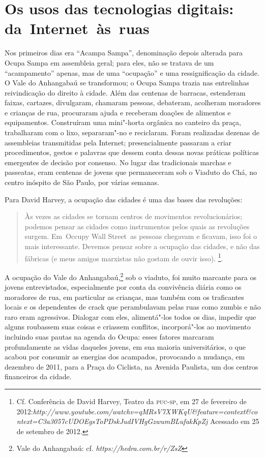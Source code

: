 \section{Os usos das tecnologias digitais: da~Internet~às~ruas}

\noindent{}Nos primeiros dias era ``Acampa Sampa'', denominação depois alterada
para Ocupa Sampa em assembleia geral; para eles, não se tratava de um
``acampamento'' apenas, mas de uma ``ocupação'' e uma ressignificação da
cidade. O Vale do Anhangabaú se transformou; o Ocupa Sampa trazia nas
entrelinhas reivindicação do direito à cidade. Além das centenas de
barracas, estenderam faixas, cartazes, divulgaram, chamaram pessoas,
debateram, acolheram moradores e crianças de rua, procuraram ajuda e
receberam doações de alimentos e equipamentos. Construíram uma
mini"-horta orgânica no canteiro da praça, trabalharam com o lixo,
separaram"-no e reciclaram. Foram realizadas dezenas de assembleias
transmitidas pela Internet; presencialmente passaram a criar
procedimentos, gestos e palavras que dessem conta dessas novas práticas
políticas emergentes de decisão por consenso. No lugar das tradicionais
marchas e passeatas, eram centenas de jovens que permaneceram sob o
Viaduto do Chá, no centro inóspito de São Paulo, por várias semanas.

Para David Harvey, a ocupação das cidades é uma das bases das
revoluções:

\begin{quote}
Às vezes as cidades se tornam centros de movimentos revolucionários;
podemos pensar as cidades como instrumentos pelos quais as revoluções
surgem. Em~Occupy Wall Street~as pessoas chegavam e ficavam, isso foi o
mais interessante. Devemos pensar sobre a ocupação das cidades, e não
das fábricas (e meus amigos marxistas não gostam de ouvir isso).
\footnote{Cf. Conferência de David Harvey, Teatro da \textsc{puc}-\textsc{sp}, em 27 de
  fevereiro de
  2012:\emph{http://www.youtube.com/watchv=qMRsV7XWKqU\&feature=context\&context=C3a3057cUDOEgsToPDskJudIVHgGzwumBLufakKpZj} %
  Acessado em 25 de setembro de 2012.}.
\end{quote}

A ocupação do Vale do Anhangabaú,\footnote{Vale do Anhangabaú: cf.
  \emph{https://hedra.com.br/r/ZsZ}} sob o
viaduto, foi muito marcante para os jovens entrevistados,
especialmente por conta da convivência diária como os moradores de rua,
em particular as crianças, mas também com os traficantes locais e os
dependentes de crack que perambulavam pelas ruas como zumbis e não raro
eram agressivos. Dialogar com eles, alimentá"-los todos os dias, impedir
que alguns roubassem suas coisas e criassem conflitos, incorporá"-los ao
movimento incluindo suas pautas na agenda do Ocupa: esses fatores
marcaram profundamente as vidas daqueles jovens, em sua maioria
universitários, o que acabou por consumir as energias dos
acampados, provocando a mudança, em dezembro de 2011, para a Praça do
Ciclista, na Avenida Paulista, um dos centros financeiros da cidade.

